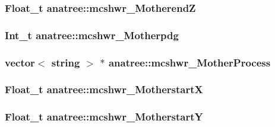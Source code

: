 \hypertarget{classanatree_a4a46467f1301e3a84832ff04b59f8de8}{
\subsubsection[{mcshwr\-\_\-\-Motherend\-Z}]{\setlength{\rightskip}{0pt plus 5cm}Float\-\_\-t anatree\-::mcshwr\-\_\-\-Motherend\-Z}}\label{classanatree_a4a46467f1301e3a84832ff04b59f8de8}
\hypertarget{classanatree_a0228433dbbb714a5e221a5e8ce41a063}{
\subsubsection[{mcshwr\-\_\-\-Motherpdg}]{\setlength{\rightskip}{0pt plus 5cm}Int\-\_\-t anatree\-::mcshwr\-\_\-\-Motherpdg}}\label{classanatree_a0228433dbbb714a5e221a5e8ce41a063}
\hypertarget{classanatree_a8eca5519b33722cef863970e40a1826a}{
\subsubsection[{mcshwr\-\_\-\-Mother\-Process}]{\setlength{\rightskip}{0pt plus 5cm}vector$<$ string $>$ $\ast$ anatree\-::mcshwr\-\_\-\-Mother\-Process}}\label{classanatree_a8eca5519b33722cef863970e40a1826a}
\hypertarget{classanatree_a714962598434731f1111efe1ce4a3f8a}{
\subsubsection[{mcshwr\-\_\-\-Motherstart\-X}]{\setlength{\rightskip}{0pt plus 5cm}Float\-\_\-t anatree\-::mcshwr\-\_\-\-Motherstart\-X}}\label{classanatree_a714962598434731f1111efe1ce4a3f8a}
\hypertarget{classanatree_ace73eae0e09f047dbf3f4f44c0298e80}{
\subsubsection[{mcshwr\-\_\-\-Motherstart\-Y}]{\setlength{\rightskip}{0pt plus 5cm}Float\-\_\-t anatree\-::mcshwr\-\_\-\-Motherstart\-Y}}\label{classanatree_ace73eae0e09f047dbf3f4f44c0298e80}
